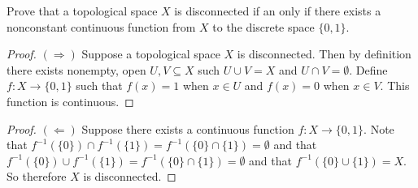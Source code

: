 \documentclass[minion]{homework651}
\begin{document}
\begin{problems}
    \problem {} Prove that a topological space $X$ is disconnected if an only if there exists a nonconstant continuous function from $X$ to the 
    discrete space $\{0, 1\}$. 
    \begin{proof} $(\Rightarrow)$ Suppose a topological space $X$ is disconnected. Then by definition there exists nonempty, open $U, V \subseteq X$ such $U \cup V = X$ and $U\cap V = \emptyset$. 
        Define $f: X \to \{0, 1\}$ such that $f(x) = 1$ when $x \in U$ and $f(x) = 0$ when $x \in V$. This function is continuous. 
    \end{proof}
    \begin{proof} $(\Leftarrow)$ Suppose there exists a continuous function $f: X \to \{0, 1\}$. Note that $f^{-1}(\{0\}) \cap f^{-1}(\{1\}) = f^{-1}(\{0\} \cap \{1\}) = \emptyset$ and that $f^{-1}(\{0\}) \cup f^{-1}(\{1\}) = f^{-1}(\{0\} \cap \{1\}) = \emptyset$ and that $f^{-1}(\{0\} \cup \{1\}) = X$. 
        So therefore $X$ is disconnected. 
    \end{proof}


\end{problems}
\end{document}
